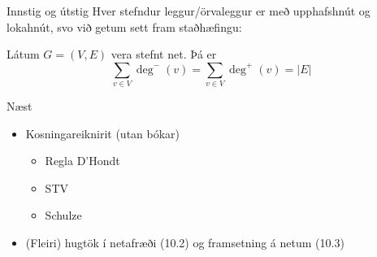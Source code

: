 \documentclass[handout]{beamer}
\begin{document}
\begin{frame}{Innstig og útstig}
    Hver stefndur leggur/örvaleggur er með upphafshnút og lokahnút, svo við getum sett fram staðhæfingu:
    
    \begin{tcolorbox}
    Látum $G = (V,E)$ vera stefnt net. Þá er
    \[
    \sum_{v\in V} \deg^-(v) = \sum_{v\in V} \deg^+(v) = |E|
    \]
    \end{tcolorbox}
\end{frame}

\begin{frame}{Næst}
    \begin{itemize}
        \item Kosningareiknirit (utan bókar)
        \begin{itemize}
            \item Regla D'Hondt
            \item STV
            \item Schulze 
        \end{itemize}
        \item (Fleiri) hugtök í netafræði (10.2) og framsetning á netum (10.3)
    \end{itemize}
\end{frame}
\end{document}
